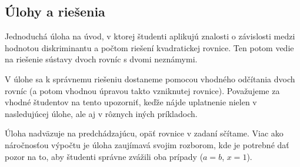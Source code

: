 

\subsection*{Úlohy a riešenia}




\kom Jednoduchá úloha na úvod, v ktorej študenti aplikujú znalosti o závislosti medzi hodnotou diskriminantu a počtom riešení kvadratickej rovnice. Ten potom vedie na riešenie sústavy dvoch rovníc s dvomi neznámymi.



\kom V úlohe sa k správnemu riešeniu dostaneme pomocou vhodného odčítania dvoch rovníc (a potom vhodnou úpravou takto vzniknutej rovnice). Považujeme za vhodné študentov na tento  upozorniť, keďže nájde uplatnenie nielen v nasledujúcej úlohe, ale aj v rôznych iných príkladoch.



\kom Úloha nadväzuje na predchádzajúcu, opäť rovnice v zadaní sčítame. Viac ako náročnosťou výpočtu je úloha zaujímavá svojim rozborom, kde je potrebné dať pozor na to, aby študenti správne zvážili oba prípady ($a=b$, $x=1$).






